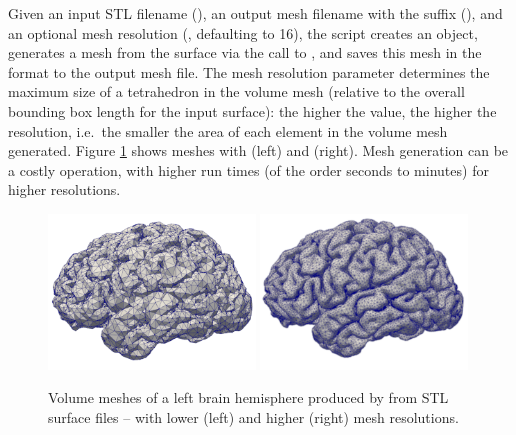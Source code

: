 \noindent Given an input STL filename (), an
output mesh filename with the  suffix
(), and an optional mesh resolution
(, defaulting to 16), the script creates an
\svmtk{}  object, generates a mesh from the
surface via the call to , and saves this
mesh in the  format to the output mesh file. The
mesh resolution parameter determines the maximum size of a tetrahedron
in the volume mesh (relative to the overall bounding box length for
the input surface): the higher the value, the higher the resolution,
i.e.~the smaller the area of each element in the volume mesh
generated. Figure \ref{fig:chp3:ernie-volume-mesh} shows meshes with
 (left) and  (right). Mesh generation can be a costly operation, with higher
run times (of the order seconds to minutes) for higher resolutions.
\begin{figure}
  \includegraphics[width=0.49\textwidth]{./chapters/chp3/FIG/ernie-volume-16-r.png}
  \includegraphics[width=0.49\textwidth]{./chapters/chp3/FIG/ernie-volume-64-r.png}
  \caption{Volume meshes of a left brain hemisphere produced by
    {\svmtk} from STL surface files -- with lower (left) and higher
    (right) mesh resolutions.}
  \label{fig:chp3:ernie-volume-mesh}
\end{figure}


